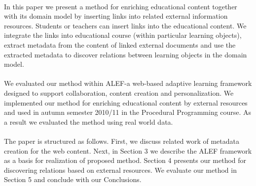 \documentclass{llncs}
\begin{document}
\\
In this paper we present a method for enriching educational content together with its domain model by inserting links into related external information resources. Students or teachers can insert links into the educational content. We integrate the links into educational course (within particular learning objects), extract metadata from the content of linked external documents and use the extracted metadata to discover relations between learning objects in the domain model.\\
\\
We evaluated our method within ALEF-a web-based adaptive learning framework designed to support collaboration, content creation and personalization. We implemented our method for enriching educational content by external resources and used in autumn semester 2010/11 in the Procedural Programming course. As a result we evaluated the method using real world data.\\
\\
The paper is structured as follows. First, we discuss related work of metadata creation for the web content. Next, in Section 3 we describe the ALEF framework as a basis for realization of proposed method. Section 4 presents our method for discovering relations based on external resources. We evaluate our method in Section 5 and conclude with our Conclusions. 
\end{document}

